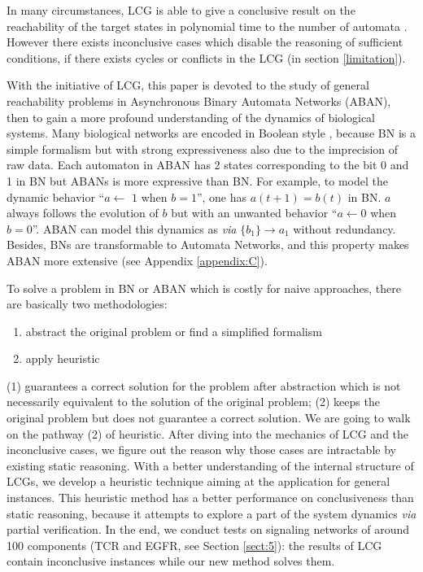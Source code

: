 \documentclass[runningheads]{llncs}
\newcommand{\ac}[3]{$\{#1\}\rightarrow#3$}
\begin{document}
In many circumstances, LCG is able to give a conclusive result on the reachability of the target states in polynomial time to the number of automata \cite{pauleve2016goal}. 
However there exists inconclusive cases which disable the reasoning of sufficient conditions, if there exists cycles or conflicts in the LCG (in section \ref{limitation}).

With the initiative of LCG, this paper is devoted to the study of general reachability problems in Asynchronous Binary Automata Networks (ABAN), then to gain a more profound understanding of the dynamics of biological systems. 
Many biological networks are encoded in Boolean style \cite{kauffman1969}, because BN is a simple formalism but with strong expressiveness also due to the imprecision of raw data.
Each automaton in ABAN has 2 states corresponding to the bit 0 and 1 in BN but ABANs is more expressive than BN. 
For example, to model the dynamic behavior ``$a\gets$ $1$ when $b=1$'', one has $a(t+1)=b(t)$ in BN.
$a$ always follows the evolution of $b$ but with an unwanted behavior ``$a\gets 0$ when $b=0$''.
ABAN can model this dynamics as \textit{via} \ac{b_1}{a_0}{a_1} without redundancy. 
Besides, BNs are transformable to Automata Networks, and this property makes ABAN more extensive (see Appendix \ref{appendix:C}).

To solve a problem in BN or ABAN which is costly for naive approaches, there are basically two methodologies: 
\begin{enumerate}
\renewcommand{\labelenumi}{(\theenumi)}
\item abstract the original problem or find a simplified formalism
\item apply heuristic
\end{enumerate}
(1) guarantees a correct solution for the problem after abstraction which is not necessarily equivalent to the solution of the original problem; 
(2) keeps the original problem but does not guarantee a correct solution.
We are going to walk on the pathway (2) of heuristic.
After diving into the mechanics of LCG and the inconclusive cases, we figure out the reason why those cases are intractable by existing static reasoning. 
With a better understanding of the internal structure of LCGs, we develop a heuristic technique aiming at the application for general instances. 
This heuristic method has a better performance on conclusiveness than static reasoning, because it attempts to explore a part of the system dynamics \textit{via} partial verification.
In the end, we conduct tests on signaling networks of around 100 components (TCR and EGFR, see Section \ref{sect:5}): the results of LCG contain inconclusive instances \cite{folschette2015} while our new method solves them.
\end{document}
